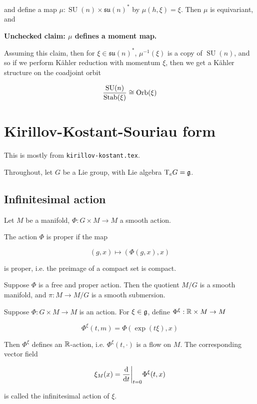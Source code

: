 \documentclass{article}
\DeclareMathOperator{\SU}{SU}
\newcommand{\su}{\mathfrak{su}}
\begin{document}
and define a map \(\mu : \SU(n) \times \su(n)^*\) by \(\mu(h, \xi) = \xi\). Then \(\mu\) is equivariant, and

\textbf{Unchecked claim: \(\mu\) defines a moment map.}

Assuming this claim, then for \(\xi \in \su(n)^*\), \(\mu^{-1}(\xi)\) is a copy of \(\SU(n)\), and so if we perform K\"ahler reduction with momentum \(\xi\), then we get a K\"ahler structure on the coadjoint orbit

\[\frac{\SU(n)}{\Stab(\xi)} \cong \Orb(\xi)\]

\appendix

\section{Kirillov-Kostant-Souriau form}

This is mostly from \texttt{kirillov-kostant.tex}.

Throughout, let \(G\) be a Lie group, with Lie algebra \(\mathrm{T}_eG = \mathfrak{g}\).

\subsection{Infinitesimal action}

Let \(M\) be a manifold, \(\Phi : G \times M \to M\) a smooth action.

\begin{definition}
     The action \(\Phi\) is proper if the map

    \[(g, x) \mapsto (\Phi(g, x), x)\]

    is proper, i.e. the preimage of a compact set is compact.
\end{definition}

\begin{proposition}
    Suppose \(\Phi\) is a free and proper action. Then the quotient \(M/G\) is a smooth manifold, and \(\pi : M \to M/G\) is a smooth submersion.
\end{proposition}

\begin{definition}
     Suppose \(\Phi : G \times M \to M\) is an action. For \(\xi \in \mathfrak{g}\), define \(\Phi^\xi : \mathbb{R} \times M \to M\)

    \[\Phi^\xi(t, m) = \Phi(\exp(t\xi), x)\]

    Then \(\Phi^\xi\) defines an \(\mathbb{R}\)-action, i.e. \(\Phi^\xi(t, \cdot)\) is a flow on \(M\). The corresponding vector field

    \[\xi_M(x) = \dv{t}\bigg\vert_{t = 0} \Phi^\xi(t, x)\]

    is called the infinitesimal action of \(\xi\).
\end{definition}
\end{document}
